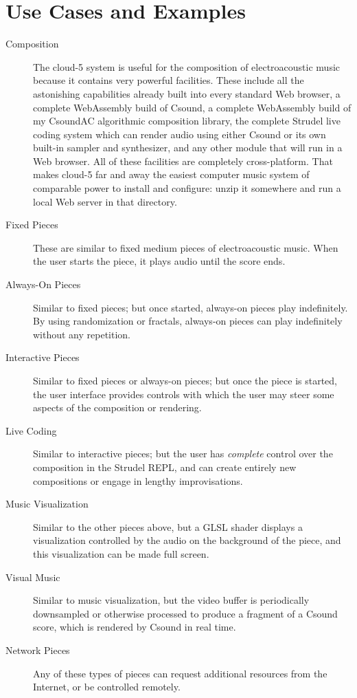 \documentclass[runningheads,a4paper]{llncs}
\begin{document}
\section{Use Cases and Examples}

\begin{description}
\item[Composition] The cloud-5 system is useful for the composition of electroacoustic music because it contains very powerful facilities. These include all the astonishing capabilities already built into every standard Web browser, a complete WebAssembly build of Csound, a complete WebAssembly build of my CsoundAC algorithmic composition library, the complete Strudel live coding system which can render audio using either Csound or its own built-in sampler and synthesizer, and any other module that will run in a Web browser. All of these facilities are completely cross-platform. That makes cloud-5 far and away the easiest computer music system of comparable power to install and configure: unzip it somewhere and run a local Web server in that directory.
\item[Fixed Pieces] These are similar to fixed medium pieces of electroacoustic music. When the user starts the piece, it plays audio until the score ends. \item[Always-On Pieces] Similar to fixed pieces; but once started, always-on pieces play indefinitely. By using randomization or fractals, always-on pieces can play indefinitely without any repetition.
\item[Interactive Pieces] Similar to fixed pieces or always-on pieces; but once the piece is started, the user interface provides controls with which the user may steer some aspects of the composition or rendering.
\item[Live Coding] Similar to interactive pieces; but the user has \emph{complete} control over the composition in the Strudel REPL, and can create entirely new compositions or engage in lengthy improvisations.
\item[Music Visualization] Similar to the other pieces above, but a GLSL shader displays a visualization controlled by the audio on the background of the piece, and this visualization can be made full screen.
\item[Visual Music] Similar to music visualization, but the video buffer is periodically downsampled or otherwise processed to produce a fragment of a Csound score, which is rendered by Csound in real time.
\item[Network Pieces] Any of these types of pieces can request additional resources from the Internet, or be controlled remotely.
\end{description}
\end{document}
